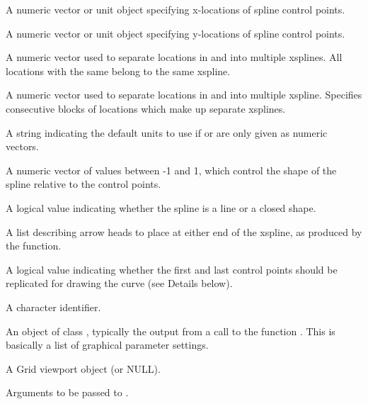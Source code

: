 \begin{Arguments}
\begin{ldescription}
\item[\code{x}] A numeric vector or unit object specifying x-locations of
spline control points.
\item[\code{y}] A numeric vector or unit object specifying y-locations of
spline control points.
\item[\code{id}] A numeric vector used to separate locations in  and
 into multiple xsplines.  All locations with the same
 belong to the same xspline.
\item[\code{id.lengths}] A numeric vector used to separate locations in  and
 into multiple xspline.  Specifies consecutive blocks of
locations which make up separate xsplines.
\item[\code{default.units}] A string indicating the default units to use
if  or 
are only given as numeric vectors. 
\item[\code{shape}] A numeric vector of values between -1 and 1, which
control the shape of the spline relative to the control points.
\item[\code{open}] A logical value indicating whether the spline is 
a line or a closed shape.
\item[\code{arrow}] A list describing arrow heads to place at either end
of the xspline, as produced by the  function.
\item[\code{repEnds}] A logical value indicating whether the first and
last control points should be replicated for drawing the curve
(see Details below).
\item[\code{name}]  A character identifier. 
\item[\code{gp}] An object of class , typically the output
from a call to the function .  This is basically
a list of graphical parameter settings.
\item[\code{vp}] A Grid viewport object (or NULL).
\item[\code{...}] Arguments to be passed to .
\end{ldescription}
\end{Arguments}
%
